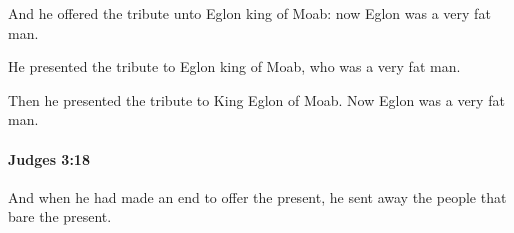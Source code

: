 			\begin{versebox}
					\item[BHS] 
					\item[ASV] And he offered the tribute unto Eglon king of Moab: now Eglon was a very fat man.
					\item[NIV] He presented the tribute to Eglon king of Moab, who was a very fat man.
					\item[NRSV] Then he presented the tribute to King Eglon of Moab. Now Eglon was a very fat man.
			\end{versebox}

		\paragraph{Judges 3:18} %
			\label{JUDGES-3-18}

			And when he had made an end to offer the present, he sent away the people that bare the present.

